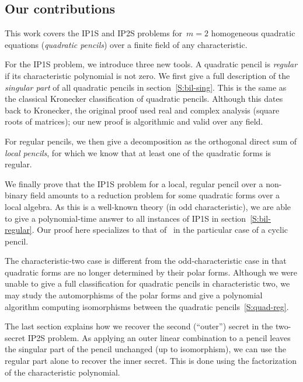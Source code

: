\documentclass{article}%
\begin{document}

\subsection*{Our contributions}%
This work covers the IP1S and IP2S problems
for~$m = 2$ homogeneous quadratic equations (\emph{quadratic pencils})
over a finite field of any characteristic.

For the IP1S problem, we introduce three new tools.
A quadratic pencil is \emph{regular}
if its characteristic polynomial is not zero.
We first give a full description of the \emph{singular part}
of all quadratic pencils in section~\ref{S:bil-sing}.
This is the same as the classical Kronecker classification of quadratic
pencils.
Although this dates back to Kronecker, the original proof used real and
complex analysis (square roots of matrices);
our new proof is algorithmic and valid over any field.

For regular pencils, we then give a decomposition as the orthogonal
direct sum of \emph{local pencils}, for which we know that at least one
of the quadratic forms is regular.

We finally prove that the IP1S problem
for a local, regular pencil over a non-binary field
amounts to a reduction problem for some quadratic forms over a local algebra.
As this is a well-known theory (in odd characteristic), we are able to
give a polynomial-time answer to all instances of IP1S in
section~\ref{S:bil-regular}. Our proof here specializes to that
of~\cite{MPG2013} in the particular case of a cyclic pencil.

The characteristic-two case is different from the odd-characteristic case
in that quadratic forms are no longer determined by their polar forms.
Although we were unable to give a full classification
for quadratic pencils in characteristic two,
we may study the automorphisms of the polar forms
and give a polynomial algorithm computing isomorphisms between the
quadratic pencils~\ref{S:quad-reg}.

\medskip

The last section explains how we recover the second (``outer'') secret in
the two-secret IP2S problem. As applying an outer linear combination to a
pencil leaves the singular part of the pencil unchanged (up to
isomorphism), we can use the regular part alone to recover the inner
secret. This is done using the factorization of the characteristic
polynomial.
\end{document}
